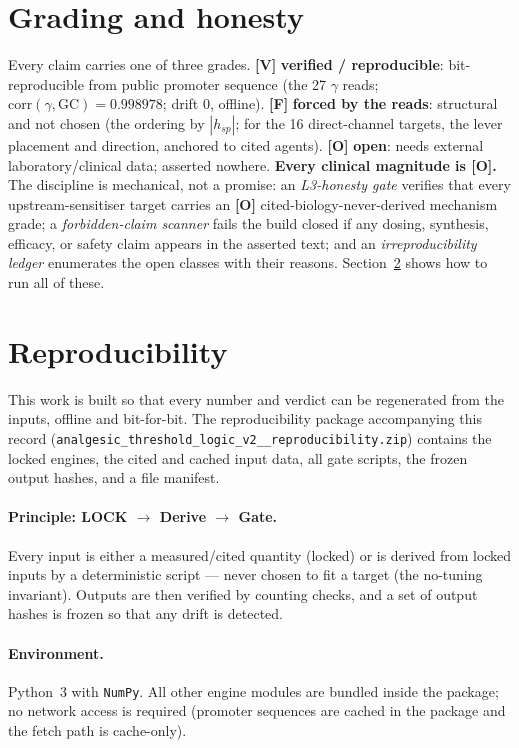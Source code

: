 \documentclass[11pt]{article}
\newcommand{\gV}{\textcolor{gv}{\textbf{[V]}}}
\newcommand{\gF}{\textcolor{gf}{\textbf{[F]}}}
\newcommand{\gO}{\textcolor{go}{\textbf{[O]}}}
\newcommand{\code}[1]{\texttt{#1}}
\newcommand{\bzip}{\texttt{analgesic\_\allowbreak threshold\_\allowbreak logic\_\allowbreak v2\_\allowbreak 0\_\allowbreak reproducibility.zip}}
\begin{document}
\section{Grading and honesty}
Every claim carries one of three grades. \gV{} \textbf{verified / reproducible}: bit-reproducible from public promoter sequence (the 27 $\gamma$ reads; $\mathrm{corr}(\gamma,\mathrm{GC})=0.998978$; drift $0$, offline). \gF{} \textbf{forced by the reads}: structural and not chosen (the ordering by $|h_{sp}|$; for the 16 direct-channel targets, the lever placement and direction, anchored to cited agents). \gO{} \textbf{open}: needs external laboratory/clinical data; asserted nowhere. \textbf{Every clinical magnitude is \gO{}.} The discipline is mechanical, not a promise: an \emph{L3-honesty gate} verifies that every upstream-sensitiser target carries an \gO{} cited-biology-never-derived mechanism grade; a \emph{forbidden-claim scanner} fails the build closed if any dosing, synthesis, efficacy, or safety claim appears in the asserted text; and an \emph{irreproducibility ledger} enumerates the open classes with their reasons. Section~\ref{sec:repro} shows how to run all of these.

\section{Reproducibility}\label{sec:repro}
This work is built so that every number and verdict can be regenerated from the inputs, offline and bit-for-bit. The reproducibility package accompanying this record (\bzip) contains the locked engines, the cited and cached input data, all gate scripts, the frozen output hashes, and a file manifest.

\paragraph{Principle: LOCK $\rightarrow$ Derive $\rightarrow$ Gate.} Every input is either a measured/cited quantity (locked) or is derived from locked inputs by a deterministic script --- never chosen to fit a target (the no-tuning invariant). Outputs are then verified by counting checks, and a set of output hashes is frozen so that any drift is detected.

\paragraph{Environment.} Python~3 with \code{NumPy}. All other engine modules are bundled inside the package; no network access is required (promoter sequences are cached in the package and the fetch path is cache-only).
\end{document}
